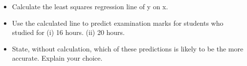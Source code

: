 \documentclass{beamer}
\begin{document}
\begin{frame}
\begin{itemize}
\item Calculate the least squares regression line of y on x.
\item  Use the calculated line to predict examination marks for students who studied for
(i) 16 hours. (ii) 20 hours.
\item State, without calculation, which of these predictions is likely to be the more
accurate. Explain your choice.
\end{itemize}
\end{frame}
\end{document}
